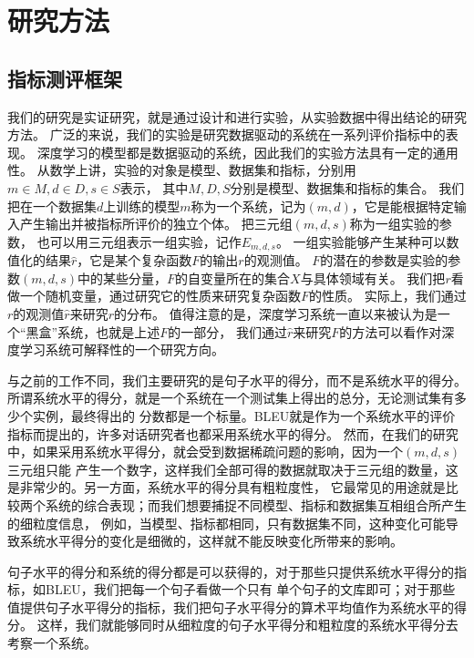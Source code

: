 
\chapter{研究方法}\label{ch:研究方法}

\section{指标测评框架}\label{sec:指标测评框架}
我们的研究是实证研究，就是通过设计和进行实验，从实验数据中得出结论的研究方法。
广泛的来说，我们的实验是研究数据驱动的系统在一系列评价指标中的表现。
深度学习的模型都是数据驱动的系统，因此我们的实验方法具有一定的通用性。
从数学上讲，实验的对象是模型、数据集和指标，分别用$m\in M, d\in D, s\in S$表示，
其中$M, D, S$分别是模型、数据集和指标的集合。
我们把在一个数据集$d$上训练的模型$m$称为一个系统，记为$(m, d)$，它是能根据特定输入产生输出并被指标所评价的独立个体。
把三元组$(m, d, s)$称为一组实验的参数， 也可以用三元组表示一组实验，记作$E_{m, d, s}$。
一组实验能够产生某种可以数值化的结果$\hat{r}$，它是某个复杂函数$\mathit{F}$的输出$r$的观测值。
$\mathit{F}$的潜在的参数是实验的参数$(m, d, s)$中的某些分量，$\mathit{F}$的自变量所在的集合$X$与具体领域有关。
我们把$r$看做一个随机变量，通过研究它的性质来研究复杂函数$\mathit{F}$的性质。
实际上，我们通过$r$的观测值$\hat{r}$来研究$r$的分布。
值得注意的是，深度学习系统一直以来被认为是一个“黑盒”系统，也就是上述$\mathit{F}$的一部分，
我们通过$\hat{r}$来研究$\mathit{F}$的方法可以看作对深度学习系统可解释性的一个研究方向。

与之前的工作不同，我们主要研究的是句子水平的得分，而不是系统水平的得分。
所谓系统水平的得分，就是一个系统在一个测试集上得出的总分，无论测试集有多少个实例，最终得出的
分数都是一个标量。BLEU就是作为一个系统水平的评价指标而提出的，许多对话研究者也都采用系统水平的得分。
然而，在我们的研究中，如果采用系统水平得分，就会受到数据稀疏问题的影响，因为一个$(m,d,s)$三元组只能
产生一个数字，这样我们全部可得的数据就取决于三元组的数量，这是非常少的。另一方面，系统水平的得分具有粗粒度性，
它最常见的用途就是比较两个系统的综合表现；而我们想要捕捉不同模型、指标和数据集互相组合所产生的细粒度信息，
例如，当模型、指标都相同，只有数据集不同，这种变化可能导致系统水平得分的变化是细微的，这样就不能反映变化所带来的影响。

句子水平的得分和系统的得分都是可以获得的，对于那些只提供系统水平得分的指标，如BLEU，我们把每一个句子看做一个只有
单个句子的文库即可；对于那些值提供句子水平得分的指标，我们把句子水平得分的算术平均值作为系统水平的得分。
这样，我们就能够同时从细粒度的句子水平得分和粗粒度的系统水平得分去考察一个系统。


